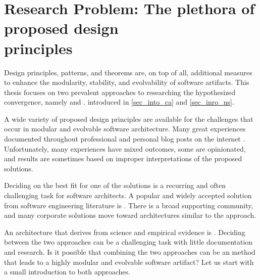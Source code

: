 \section{Research Problem: The plethora of proposed design \\ principles}
\label{sec_research_problem}

Design principles, patterns, and theorems are, on top of all, additional measures to
enhance the modularity, stability, and evolvability of software artifacts. This thesis
focuses on two prevalent approaches to researching the hypothesized convergence, namely
\ns and \ca. introduced in \ref{sec_into_ca} and \ref{sec_inro_ns}. 

A wide variety of proposed design principles are available for the challenges that occur
in modular and evolvable software architecture. Many great experiences documented
throughout professional and personal blog posts on the internet \parencites{noauthor_dont_nodate,
noauthor_generalization_nodate, noauthor_law_nodate}. Unfortunately, many
experiences have mixed outcomes, some are opinionated, and results are sometimes based on
improper interpretations of the proposed solutions.

Deciding on the best fit for one of the solutions is a recurring and often challenging task
for software architects. A popular and widely accepted solution from software engineering
literature is \ca. There is a broad supporting community, and many corporate
solutions move toward architectures similar to the \ca
approach. 

An architecture that derives from science and empirical evidence is \ns
\parencite{mannaert_normalized_2009,mannaert_normalized_2016}. Deciding between the two
approaches can be a challenging task with little documentation and research. Is it
possible that combining the two approaches can be an method that leads to a highly modular
and evolvable software artifact? Let us start with a small introduction to both
approaches.